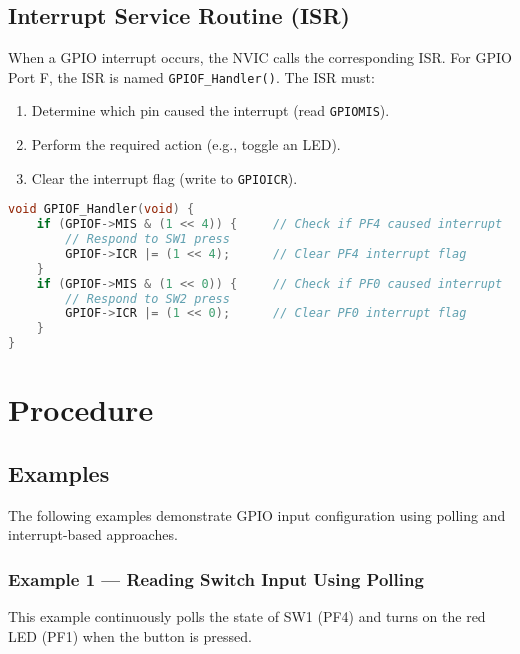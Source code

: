 \subsection{Interrupt Service Routine (ISR)}

When a GPIO interrupt occurs, the NVIC calls the corresponding ISR. For GPIO Port F, the ISR is named \texttt{GPIOF\_Handler()}. The ISR must:

\begin{enumerate}[nosep]
  \item Determine which pin caused the interrupt (read \texttt{GPIOMIS}).
  \item Perform the required action (e.g., toggle an LED).
  \item Clear the interrupt flag (write to \texttt{GPIOICR}).
\end{enumerate}

\begin{lstlisting}[caption={GPIO Port F ISR Template}, language=C]
void GPIOF_Handler(void) {
    if (GPIOF->MIS & (1 << 4)) {     // Check if PF4 caused interrupt
        // Respond to SW1 press
        GPIOF->ICR |= (1 << 4);      // Clear PF4 interrupt flag
    }
    if (GPIOF->MIS & (1 << 0)) {     // Check if PF0 caused interrupt
        // Respond to SW2 press
        GPIOF->ICR |= (1 << 0);      // Clear PF0 interrupt flag
    }
}
\end{lstlisting}


\newpage
\section{Procedure}

\subsection{Examples}

The following examples demonstrate GPIO input configuration using polling and interrupt-based approaches.

\subsubsection{Example 1 — Reading Switch Input Using Polling}

This example continuously polls the state of SW1 (PF4) and turns on the red LED (PF1) when the button is pressed.



